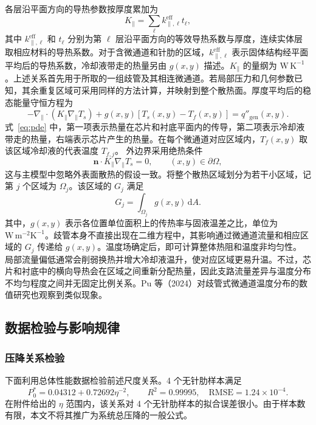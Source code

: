 \documentclass[withoutpreface,bwprint]{cumcmthesis}
\newcommand{\Pstar}{P^{*}}
\newcommand{\vect}[1]{\bm{#1}}
\begin{document}
各层沿平面方向的导热参数按厚度累加为
\begin{equation}
K_{\parallel}=\sum_{\ell}k_{\parallel,\ell}^{\mathrm{eff}}t_{\ell},
\end{equation}
其中 $k_{\parallel,\ell}^{\mathrm{eff}}$ 和 $t_\ell$ 分别为第 $\ell$ 层沿平面方向的等效导热系数与厚度，连续实体层取相应材料的导热系数。对于含微通道和针肋的区域，$k_{\parallel,\ell}^{\mathrm{eff}}$ 表示固体结构经平面平均后的导热系数，冷却液带走的热量另由 $g(x,y)$ 描述。$K_{\parallel}$ 的量纲为 $\mathrm{W\,K^{-1}}$。上述关系首先用于所取的一组歧管及其相连微通道。若局部压力和几何参数已知，其余重复区域可采用同样的方法计算，并映射到整个散热面。厚度平均后的稳态能量守恒方程为
\begin{equation}
-\nabla_{\parallel}\!\cdot\!\left(K_{\parallel}\nabla_{\parallel}T_s\right)
+g(x,y)[T_s(x,y)-T_f(x,y)]=q''_{\mathrm{gen}}(x,y).
\label{eq:pde}
\end{equation}
式~\eqref{eq:pde} 中，第一项表示热量在芯片和衬底平面内的传导，第二项表示冷却液带走的热量，右端表示芯片产生的热量。在每个微通道对应区域内，$T_f(x,y)$ 取该区域冷却液的代表温度 $T_{f,j}$。
外边界采用绝热条件
\begin{equation}
\vect n\cdot K_{\parallel}\nabla_{\parallel}T_s=0,\qquad (x,y)\in\partial\Omega,
\end{equation}
这与主模型中忽略外表面散热的假设一致。将整个散热区域划分为若干小区域，记第 $j$ 个区域为 $\Omega_j$。该区域的 $G_j$ 满足
\begin{equation}
G_j=\int_{\Omega_j}g(x,y)\,\mathrm dA.
\end{equation}
其中，$g(x,y)$ 表示各位置单位面积上的传热率与固液温差之比，单位为 $\mathrm{W\,m^{-2}K^{-1}}$。歧管本身不直接出现在二维方程中，其影响通过微通道流量和相应区域的 $G_j$ 传递给 $g(x,y)$。温度场确定后，即可计算整体热阻和温度非均匀性。
局部流量偏低通常会削弱换热并增大冷却液温升，使对应区域更易升温。不过，芯片和衬底中的横向导热会在区域之间重新分配热量，因此支路流量差异与温度分布不均匀程度之间并无固定比例关系。Pu 等（2024）对歧管式微通道温度分布的数值研究也观察到类似现象\cite{Pu2024}。

\subsection{数据检验与影响规律}
\subsubsection{压降关系检验}
下面利用总体性能数据检验前述尺度关系。4 个无针肋样本满足
\begin{equation}
\Pstar_0=0.04312+0.72692\eta^{-2},\qquad
R^2=0.99995,\quad \mathrm{RMSE}=1.24\times10^{-4}.
\end{equation}
在附件给出的 $\eta$ 范围内，该关系对 4 个无针肋样本的拟合误差很小。由于样本数有限，本文不将其推广为系统总压降的一般公式。
\end{document}
